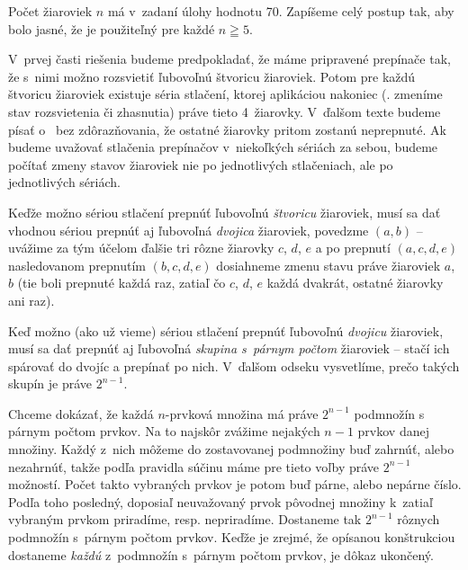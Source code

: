 {%
Počet žiaroviek $n$ má v~zadaní úlohy hodnotu 70.
Zapíšeme celý postup tak, aby bolo jasné, že je použiteľný pre
každé $n\geqq5$.

V~prvej časti riešenia budeme predpokladať, že máme pripravené
prepínače tak, že s~nimi možno rozsvietiť ľubovoľnú štvoricu žiaroviek.
Potom pre každú štvoricu žiaroviek existuje séria
stlačení, ktorej aplikáciou nakoniec  (\tj. zmeníme stav
rozsvietenia či zhasnutia) práve tieto 4~žiarovky. V~ďalšom texte
budeme písať o~ bez zdôrazňovania,
že ostatné žiarovky pritom zostanú neprepnuté. Ak budeme
uvažovať stlačenia prepínačov v~niekoľkých sériách za sebou, budeme
počítať zmeny stavov žiaroviek nie po jednotlivých stlačeniach,
ale po jednotlivých sériách.

Keďže možno sériou stlačení prepnúť ľubovoľnú {\it štvoricu\/} žiaroviek,
musí sa dať vhodnou sériou prepnúť aj ľubovoľná {\it dvojica\/} žiaroviek,
povedzme $(a,b)$ -- uvážime za tým účelom ďalšie tri rôzne žiarovky $c$, $d$, $e$ a
po prepnutí $(a,c,d,e)$ nasledovanom prepnutím $(b,c,d,e)$
dosiahneme zmenu stavu práve žiaroviek $a$, $b$ (tie boli
prepnuté každá raz, zatiaľ čo $c$, $d$, $e$ každá dvakrát,
ostatné žiarovky ani raz).

Keď možno (ako už vieme) sériou stlačení prepnúť ľubovoľnú
{\it dvojicu\/} žiaroviek, musí sa dať prepnúť
aj ľubovoľná {\it skupina s~párnym počtom\/}
žiaroviek -- stačí ich spárovať do dvojíc a prepínať po nich.
V~ďalšom odseku vysvetlíme, prečo takých skupín je práve
$2^{n-1}$.

Chceme dokázať, že každá $n$-prvková množina má práve
$2^{n-1}$ podmnožín s párnym počtom prvkov. Na to najskôr zvážime
nejakých $n-1$ prvkov danej množiny. Každý z~nich môžeme do
zostavovanej podmnožiny buď zahrnúť, alebo nezahrnúť, takže podľa
pravidla súčinu máme pre tieto voľby práve $2^{n-1}$ možností.
Počet takto vybraných prvkov je potom buď párne, alebo nepárne číslo.
Podľa toho posledný, doposiaľ neuvažovaný prvok pôvodnej množiny
k~zatiaľ vybraným prvkom priradíme, resp. nepriradíme. Dostaneme
tak $2^{n-1}$ rôznych podmnožín s~párnym počtom prvkov. Keďže
je zrejmé, že opísanou konštrukciou dostaneme {\it každú\/}
z~podmnožín s~párnym počtom prvkov, je dôkaz ukončený.

}
